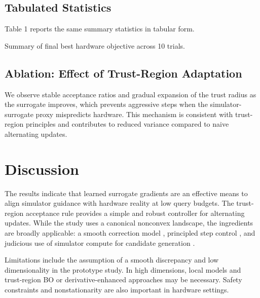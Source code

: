 \subsection{Tabulated Statistics}
Table 1 reports the same summary statistics in tabular form.

\begin{table}[h]
\centering
\begin{adjustbox}{width=\linewidth}
\end{adjustbox}
\caption{Summary of final best hardware objective across 10 trials.}
\end{table}

\subsection{Ablation: Effect of Trust-Region Adaptation}
We observe stable acceptance ratios and gradual expansion of the trust radius as the surrogate improves, which prevents aggressive steps when the simulator-surrogate proxy mispredicts hardware. This mechanism is consistent with trust-region principles \citep{Conn2000} and contributes to reduced variance compared to naive alternating updates.

\section{Discussion}
The results indicate that learned surrogate gradients are an effective means to align simulator guidance with hardware reality at low query budgets. The trust-region acceptance rule provides a simple and robust controller for alternating updates. While the study uses a canonical nonconvex landscape, the ingredients are broadly applicable: a smooth correction model \citep{Perdikaris2017,Forrester2007}, principled step control \citep{Conn2000}, and judicious use of simulator compute for candidate generation \citep{Shahriari2016,Frazier2018}.

Limitations include the assumption of a smooth discrepancy and low dimensionality in the prototype study. In high dimensions, local models and trust-region BO \citep{Eriksson2019} or derivative-enhanced approaches \citep{Wu2017} may be necessary. Safety constraints \citep{Kirschner2019} and nonstationarity are also important in hardware settings.


